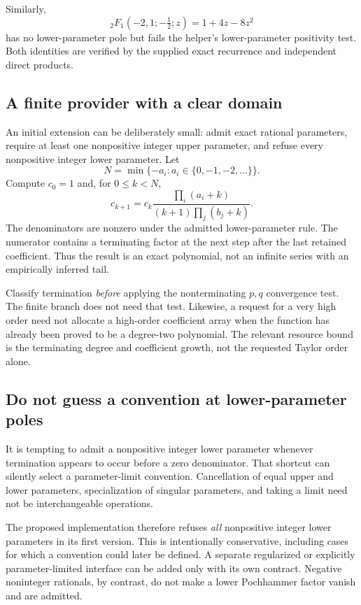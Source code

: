 \documentclass[11pt,letterpaper]{article}
\begin{document}
Similarly,
\begin{equation}
 {}_2F_1(-2,1;-\tfrac12;z)=1+4z-8z^2
 \label{eq:2f1}
\end{equation}
has no lower-parameter pole but fails the helper's lower-parameter positivity
test. Both identities are verified by the supplied exact recurrence and
independent direct products.

\subsection{A finite provider with a clear domain}
An initial extension can be deliberately small: admit exact rational
parameters, require at least one nonpositive integer upper parameter, and
refuse every nonpositive integer lower parameter. Let
\[
 N=\min\{-a_i:a_i\in\{0,-1,-2,\ldots\}\}.
\]
Compute $c_0=1$ and, for $0\le k<N$,
\begin{equation}
 c_{k+1}=c_k\frac{\prod_i(a_i+k)}{(k+1)\prod_j(b_j+k)}.
 \label{eq:pfq-recurrence}
\end{equation}
The denominators are nonzero under the admitted lower-parameter rule.
The numerator contains a terminating factor at the next step after the
last retained coefficient. Thus the result is an exact polynomial, not an
infinite series with an empirically inferred tail.

Classify termination \emph{before} applying the nonterminating $p,q$
convergence test. The finite branch does not need that test. Likewise, a
request for a very high order need not allocate a high-order coefficient
array when the function has already been proved to be a degree-two
polynomial. The relevant resource bound is the terminating degree and
coefficient growth, not the requested Taylor order alone.

\subsection{Do not guess a convention at lower-parameter poles}
It is tempting to admit a nonpositive integer lower parameter whenever
termination appears to occur before a zero denominator. That shortcut can
silently select a parameter-limit convention. Cancellation of equal upper
and lower parameters, specialization of singular parameters, and taking a
limit need not be interchangeable operations.

The proposed implementation therefore refuses \emph{all} nonpositive integer
lower parameters in its first version. This is intentionally conservative,
including cases for which a convention could later be defined. A separate
regularized or explicitly parameter-limited interface can be added only
with its own contract. Negative noninteger rationals, by contrast, do not
make a lower Pochhammer factor vanish and are admitted.
\end{document}

